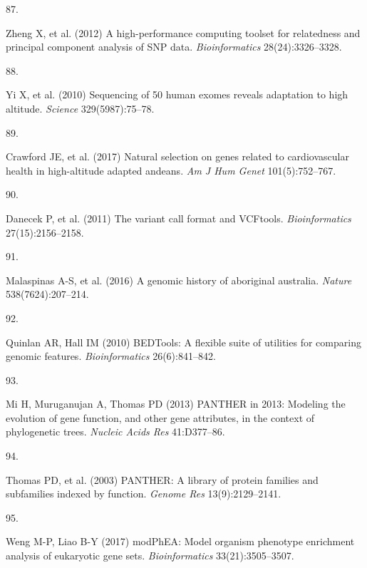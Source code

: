 \documentclass[9pt,twocolumn,twoside,lineno]{pnas-new}
\newlength{\cslhangindent}
\newlength{\csllabelwidth}
\newlength{\cslentryspacingunit} %
\newenvironment{CSLReferences}[2] %
 {%
  \setlength{\parindent}{0pt}
  \ifodd #1
  \let\oldpar\par
  \def\par{\hangindent=\cslhangindent\oldpar}
  \fi
  \setlength{\parskip}{#2\cslentryspacingunit}
 }%
 {}
\newcommand{\CSLLeftMargin}[1]{\parbox[t]{\csllabelwidth}{#1}}
\newcommand{\CSLRightInline}[1]{\parbox[t]{\linewidth - \csllabelwidth}{#1}\break}
\begin{document}
\begin{CSLReferences}{0}{0}
\leavevmode{}%
\CSLLeftMargin{87. }%
\CSLRightInline{Zheng X, et al. (2012) A high-performance computing
toolset for relatedness and principal component analysis of {SNP} data.
\emph{Bioinformatics} 28(24):3326--3328.}

\leavevmode{}%
\CSLLeftMargin{88. }%
\CSLRightInline{Yi X, et al. (2010) Sequencing of 50 human exomes
reveals adaptation to high altitude. \emph{Science} 329(5987):75--78.}

\leavevmode{}%
\CSLLeftMargin{89. }%
\CSLRightInline{Crawford JE, et al. (2017) Natural selection on genes
related to cardiovascular health in {high-altitude} adapted andeans.
\emph{Am J Hum Genet} 101(5):752--767.}

\leavevmode{}%
\CSLLeftMargin{90. }%
\CSLRightInline{Danecek P, et al. (2011) The variant call format and
{VCFtools}. \emph{Bioinformatics} 27(15):2156--2158.}

\leavevmode{}%
\CSLLeftMargin{91. }%
\CSLRightInline{Malaspinas A-S, et al. (2016) A genomic history of
aboriginal australia. \emph{Nature} 538(7624):207--214.}

\leavevmode{}%
\CSLLeftMargin{92. }%
\CSLRightInline{Quinlan AR, Hall IM (2010) {BEDTools}: A flexible suite
of utilities for comparing genomic features. \emph{Bioinformatics}
26(6):841--842.}

\leavevmode{}%
\CSLLeftMargin{93. }%
\CSLRightInline{Mi H, Muruganujan A, Thomas PD (2013) PANTHER in 2013:
Modeling the evolution of gene function, and other gene attributes, in
the context of phylogenetic trees. \emph{Nucleic Acids Res}
41:D377--86.}

\leavevmode{}%
\CSLLeftMargin{94. }%
\CSLRightInline{Thomas PD, et al. (2003) {PANTHER}: A library of protein
families and subfamilies indexed by function. \emph{Genome Res}
13(9):2129--2141.}

\leavevmode{}%
\CSLLeftMargin{95. }%
\CSLRightInline{Weng M-P, Liao B-Y (2017) {modPhEA}: Model organism
phenotype enrichment analysis of eukaryotic gene sets.
\emph{Bioinformatics} 33(21):3505--3507.}

\end{CSLReferences}



% 
\end{document}
